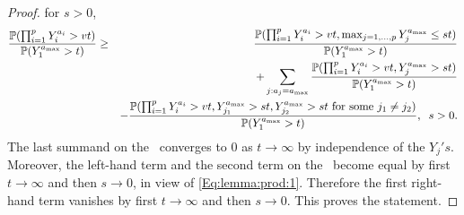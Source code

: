 \begin{proof}
for $s>0$,
\begin{eqnarray*}  \frac{\P(\prod_{i=1}^pY_i^{a_i}>vt) }{\P(Y_1^{a_{\max}}>t)}  &\geq& \frac{\P(\prod_{i=1}^pY_i^{a_i}>vt, \max_{j=1, \ldots, p}Y_j^{a_{\max}}\leq st) }{\P(Y_1^{a_{\max}}>t)} \\
&& + \sum_{j:a_j =a_{\max}} \frac{\P(\prod_{i=1}^pY_i^{a_i}>vt, Y_j^{a_{\max}}>st) }{\P(Y_1^{a_{\max}}>t)}\\
&& -\frac{\P(\prod_{i=1}^pY_i^{a_i}>vt, Y_{j_1}^{a_{\max}}>st, Y_{j_2}^{a_{\max}}>st \mbox{ for some } j_1\neq j_2) }{\P(Y_1^{a_{\max}}>t)}, \;\; s>0.
\end{eqnarray*} 
The last summand on the \rhs\  
converges to 0 as $t \to \infty$ by independence of the $Y_j's$. Moreover,  the left-hand term and the second term 
on the \rhs\ become equal by first $t \to \infty$ and then $s \to 0$, in view of \eqref{Eq:lemma:prod:1}. Therefore 
the first right-hand term vanishes by first $t \to \infty$ and then $s \to 0$. This proves the statement.
\end{proof}
\ele
